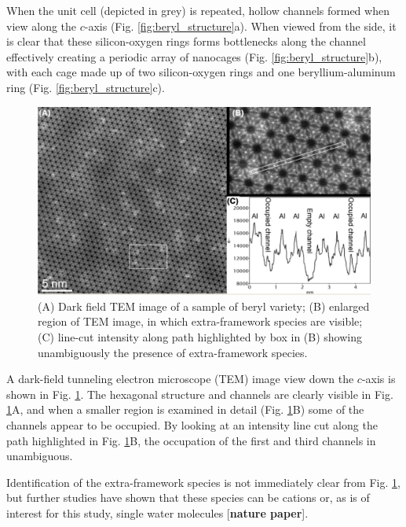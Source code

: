         When the unit cell (depicted in grey) is repeated, hollow channels formed when view along the $c$-axis (Fig. \ref{fig:beryl_structure}a). When viewed from the side, it is clear that these silicon-oxygen rings forms bottlenecks along the channel effectively creating a periodic array of nanocages (Fig. \ref{fig:beryl_structure}b), with each cage made up of two silicon-oxygen rings and one beryllium-aluminum ring (Fig. \ref{fig:beryl_structure}c).
        
        \begin{figure}
            \centering
            \includegraphics[width=0.9\linewidth]{Figures/System/beryl_tem.png}
            \caption{(A) Dark field TEM image of a sample of beryl variety; (B) enlarged region of TEM image, in which extra-framework species are visible; (C) line-cut intensity along path highlighted by box in (B) showing unambiguously the presence of extra-framework species.}
            \label{fig:beryl_tem}
        \end{figure}
        
        A dark-field tunneling electron microscope (TEM) image view down the $c$-axis is shown in Fig. \ref{fig:beryl_tem}. The hexagonal structure and channels are clearly visible in Fig. \ref{fig:beryl_tem}A, and when a smaller region is examined in detail (Fig. \ref{fig:beryl_tem}B) some of the channels appear to be occupied. By looking at an intensity line cut along the path highlighted in Fig. \ref{fig:beryl_tem}B, the occupation of the first and third channels in unambiguous. 
        
        Identification of the extra-framework species is not immediately clear from Fig. \ref{fig:beryl_tem}, but further studies have shown that these species can be cations or, as is of interest for this study, single water molecules [\textbf{nature paper}].
        
